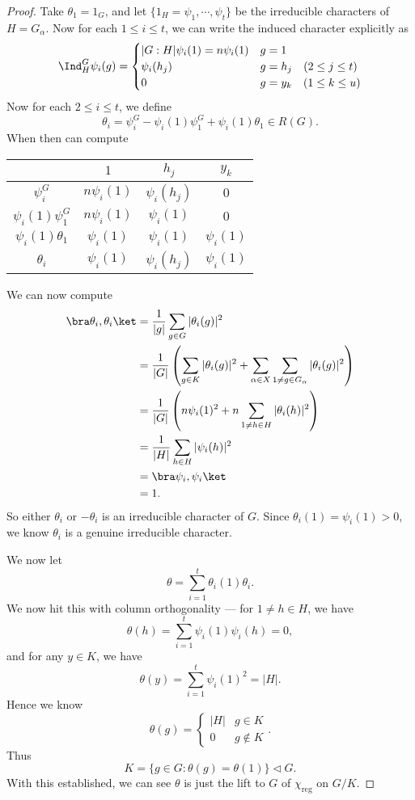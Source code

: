 \documentclass[a4paper]{article}
\begin{document}
\begin{proof}
  Take $\theta_1 = 1_G$, and let $\{1_H = \psi_1, \cdots, \psi_t\}$ be the irreducible characters of $H = G_\alpha$. Now for each $1 \leq i \leq t$, we can write the induced character explicitly as
  \[
    \Ind_H^G \psi_i(g) =
    \begin{cases}
      |G:H| \psi_i(1) = n \psi_i (1) & g = 1\\
      \psi_i(h_j) & g = h_j\quad (2 \leq j \leq t)\\
      0 & g = y_k\quad (1 \leq k \leq u)
    \end{cases}
  \]
  Now for each $2 \leq i \leq t$, we define
  \[
    \theta_i = \psi_i^G - \psi_i(1) \psi_1^G + \psi_i(1) \theta_1 \in R(G).
  \]
  When then can compute
  \begin{center}
    \begin{tabular}{cccc}
      \toprule
      & $1$ & $h_j$ & $y_k$\\
      \midrule
      $\psi_i^G$ & $n \psi_i(1)$ & $\psi_i(h_j)$ & $0$\\
      $\psi_i(1) \psi_1^G$ & $n \psi_i(1)$ & $\psi_i(1)$ & $0$\\
      $\psi_i(1) \theta_1$ & $\psi_i(1)$ & $\psi_i(1)$ & $\psi_i(1)$\\
      $\theta_i$ & $\psi_i(1)$ & $\psi_i(h_j)$ & $\psi_i(1)$\\
      \bottomrule
    \end{tabular}
  \end{center}
  We can now compute
  \begin{align*}
    \bra \theta_i, \theta_i\ket &= \frac{1}{|g|} \sum_{g \in G} |\theta_i(g)|^2\\
    &= \frac{1}{|G|} \left(\sum_{g \in K} |\theta_i(g)|^2 + \sum_{\alpha \in X}\sum_{1 \not= g \in G_\alpha}|\theta_i(g)|^2\right)\\
    &= \frac{1}{|G|} \left(n \psi_i(1)^2 + n \sum_{1 \not= h \in H} |\theta_i (h)|^2\right)\\
    &= \frac{1}{|H|} \sum_{h \in H} |\psi_i(h)|^2\\
    &= \bra \psi_i, \psi_i \ket\\
    &= 1.
  \end{align*}
  So either $\theta_i$ or $-\theta_i$ is an irreducible character of $G$. Since $\theta_i(1) = \psi_i(1) > 0$, we know $\theta_i$ is a genuine irreducible character.

  We now let
  \[
    \theta = \sum_{i = 1}^t \theta_i(1) \theta_i.
  \]
  We now hit this with column orthogonality --- for $1 \not= h \in H$, we have
  \[
    \theta(h) = \sum_{i = 1}^t \psi_i(1) \psi_i(h) = 0,
  \]
  and for any $y \in K$, we have
  \[
    \theta(y) = \sum_{i = 1}^t \psi_i(1)^2 = |H|.
  \]
  Hence we know
  \[
    \theta(g) =
    \begin{cases}
      |H| & g \in K\\
      0 & g \not\in K
    \end{cases}.
  \]
  Thus
  \[
    K = \{g \in G: \theta(g) = \theta(1)\} \lhd G.
  \]
  With this established, we can see $\theta$ is just the lift to $G$ of $\chi_{\mathrm{reg}}$ on $G/K$.
\end{proof}
\end{document}
